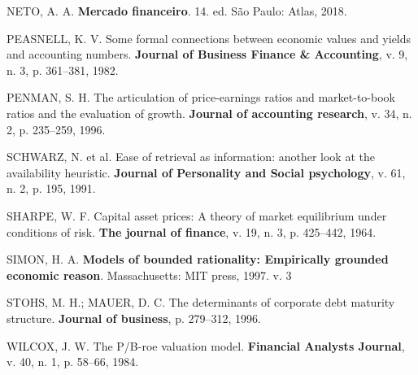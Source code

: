 \documentclass[grad,numbers]{coppe}
\newenvironment{cslreferences}%
  {}%
  {\par}
\begin{document}
\begin{cslreferences}
  \leavevmode\hypertarget{ref-assafneto2018}{}%
  NETO, A. A. \textbf{Mercado financeiro}. 14. ed. São Paulo: Atlas, 2018.

  \leavevmode\hypertarget{ref-peasnell1982}{}%
  PEASNELL, K. V. Some formal connections between economic values and yields and accounting numbers. \textbf{Journal of Business Finance \& Accounting}, v. 9, n. 3, p. 361--381, 1982.

  \leavevmode\hypertarget{ref-penman1996}{}%
  PENMAN, S. H. The articulation of price-earnings ratios and market-to-book ratios and the evaluation of growth. \textbf{Journal of accounting research}, v. 34, n. 2, p. 235--259, 1996.

  \leavevmode\hypertarget{ref-schwarz1991}{}%
  SCHWARZ, N. et al. Ease of retrieval as information: another look at the availability heuristic. \textbf{Journal of Personality and Social psychology}, v. 61, n. 2, p. 195, 1991.

  \leavevmode\hypertarget{ref-sharpe1964}{}%
  SHARPE, W. F. Capital asset prices: A theory of market equilibrium under conditions of risk. \textbf{The journal of finance}, v. 19, n. 3, p. 425--442, 1964.

  \leavevmode\hypertarget{ref-simon1997}{}%
  SIMON, H. A. \textbf{Models of bounded rationality: Empirically grounded economic reason}. Massachusetts: MIT press, 1997. v. 3

  \leavevmode\hypertarget{ref-stohs1996}{}%
  STOHS, M. H.; MAUER, D. C. The determinants of corporate debt maturity structure. \textbf{Journal of business}, p. 279--312, 1996.

  \leavevmode\hypertarget{ref-wilcox1984}{}%
  WILCOX, J. W. The P/B-roe valuation model. \textbf{Financial Analysts Journal}, v. 40, n. 1, p. 58--66, 1984.
  \end{cslreferences}
  \backmatter
  
  

\end{document}

